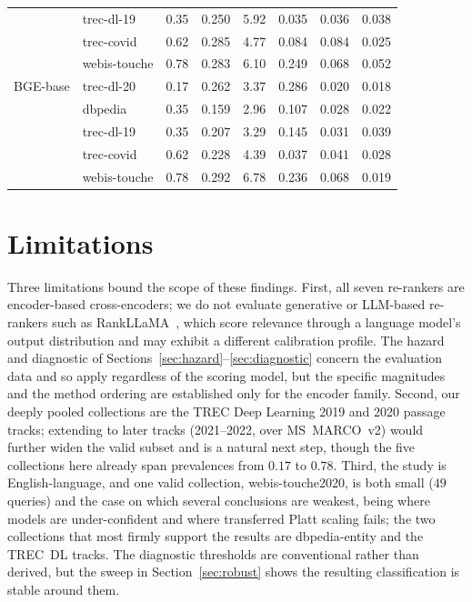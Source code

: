 \documentclass[sigconf,nonacm]{acmart}
\begin{document}
\begin{table}[t]
\begin{tabular}{llrrrrrr}
            & trec-dl-19 & 0.35 & 0.250 &  5.92 & 0.035 & 0.036 & 0.038 \\
            & trec-covid & 0.62 & 0.285 &  4.77 & 0.084 & 0.084 & 0.025 \\
            & webis-touche & 0.78 & 0.283 &  6.10 & 0.249 & 0.068 & 0.052 \\
\midrule
BGE-base    & trec-dl-20 & 0.17 & 0.262 &  3.37 & 0.286 & 0.020 & 0.018 \\
            & dbpedia    & 0.35 & 0.159 &  2.96 & 0.107 & 0.028 & 0.022 \\
            & trec-dl-19 & 0.35 & 0.207 &  3.29 & 0.145 & 0.031 & 0.039 \\
            & trec-covid & 0.62 & 0.228 &  4.39 & 0.037 & 0.041 & 0.028 \\
            & webis-touche & 0.78 & 0.292 &  6.78 & 0.236 & 0.068 & 0.019 \\
\bottomrule
\end{tabular}
\end{table}

\section{Limitations}\label{sec:limitations}

Three limitations bound the scope of these findings. First, all seven re-rankers are
encoder-based cross-encoders; we do not evaluate generative or LLM-based re-rankers
such as RankLLaMA~\cite{ma2024rankllama}, which score relevance through a language
model's output distribution and may exhibit a different calibration profile. The
hazard and diagnostic of Sections~\ref{sec:hazard}--\ref{sec:diagnostic} concern the
evaluation data and so apply regardless of the scoring model, but the specific
magnitudes and the method ordering are established only for the encoder family.
Second, our deeply pooled collections are the TREC Deep Learning 2019 and 2020 passage
tracks; extending to later tracks (2021--2022, over MS~MARCO~v2) would further widen
the valid subset and is a natural next step, though the five collections here already
span prevalences from $0.17$ to $0.78$. Third, the study is English-language, and one
valid collection, webis-touche2020, is both small ($49$ queries) and the case on which
several conclusions are weakest, being where models are under-confident and where
transferred Platt scaling fails; the two collections that most firmly support the
results are dbpedia-entity and the TREC~DL tracks. The diagnostic thresholds are
conventional rather than derived, but the sweep in Section~\ref{sec:robust} shows the
resulting classification is stable around them.
\end{document}
